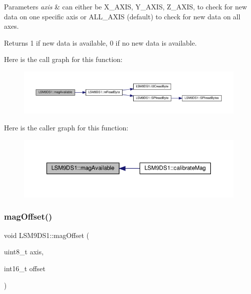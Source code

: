 \begin{DoxyParams}{Parameters}
{\em axis} & can either be X\+\_\+\+A\+X\+IS, Y\+\_\+\+A\+X\+IS, Z\+\_\+\+A\+X\+IS, to check for new data on one specific axis or A\+L\+L\+\_\+\+A\+X\+IS (default) to check for new data on all axes. \\
\hline
\end{DoxyParams}
\begin{DoxyReturn}{Returns}
1 if new data is available, 0 if no new data is available. 
\end{DoxyReturn}
Here is the call graph for this function\+:\nopagebreak
\begin{figure}[H]
\begin{center}
\leavevmode
\includegraphics[width=350pt]{classLSM9DS1_a85afd29e95bead7b3f0083a9a235d1df_cgraph}
\end{center}
\end{figure}
Here is the caller graph for this function\+:\nopagebreak
\begin{figure}[H]
\begin{center}
\leavevmode
\includegraphics[width=350pt]{classLSM9DS1_a85afd29e95bead7b3f0083a9a235d1df_icgraph}
\end{center}
\end{figure}
\mbox{\label{classLSM9DS1_a0d461614bd058b082c94481dc916c18b}} 
\subsubsection{\texorpdfstring{mag\+Offset()}{magOffset()}}
{\footnotesize\ttfamily void L\+S\+M9\+D\+S1\+::mag\+Offset (\begin{DoxyParamCaption}\item[{uint8\+\_\+t}]{axis,  }\item[{int16\+\_\+t}]{offset }\end{DoxyParamCaption})}



